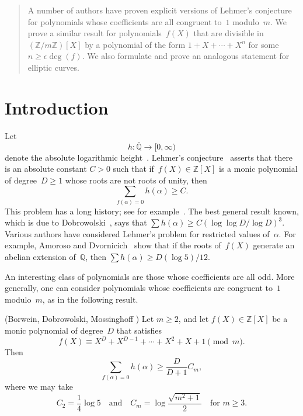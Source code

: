 \begin{abstract}
A number of authors have proven explicit versions of Lehmer's
conjecture for polynomials whose coefficients are all congruent to~$1$
modulo~$m$. We prove a similar result for polynomials~$f(X)$ that are
divisible in~$({\mathbb{Z}}/m{\mathbb{Z}})[X]$ by a polynomial of the form
$1+X+\cdots+X^n$ for some $n\ge{\epsilon} \deg(f)$. We also formulate and
prove an analogous statement for elliptic curves.
\end{abstract}

\maketitle

\section*{Introduction}

Let
\[
  h:{{\bar{\mathbb{Q}}}}\longrightarrow[0,\infty)
\]
denote the absolute logarithmic height~\cite{HiSi,LangDG}. Lehmer's
conjecture~\cite{Leh} asserts that there is an absolute constant $C>0$
such that if~$f(X)\in{\mathbb{Z}}[X]$ is a monic polynomial of degree~$D\ge1$
whose roots are not roots of unity, then
\begin{equation}
  \label{eqn:lehmerconj}
  \sum_{f({\alpha})=0} h({\alpha}) \ge C.
\end{equation}
This problem has a long history; see for
example~\cite{BlMo,Leh,Smy2,Smy1,Stew}.  The best general result
known, which is due to Dobrowolski~\cite{Dob}, says that $\sum
h({\alpha})\ge C(\log\log D/\log D)^3$.  Various authors have considered
Lehmer's problem for restricted values of~${\alpha}$. For example, Amoroso
and Dvornicich~\cite{AmDv} show that if the roots of~$f(X)$ generate
an abelian extension of~${\mathbb{Q}}$, then $\sum h({\alpha})\ge D(\log5)/12$.  
\par
An interesting class of polynomials are those whose coefficients are
all odd. More generally, one can consider polynomials whose
coefficients are congruent to~$1$ modulo~$m$, as in the following
result.

\begin{theorem}
\label{thm:lehmodm}
\textup{(Borwein, Dobrowolski, Mossinghoff \cite{BoDoMo})} 
Let $m\ge2$, and let $f(X)\in{\mathbb{Z}}[X]$ be a monic polynomial of
degree~$D$ that satisfies
\begin{equation}
\label{eqn:feqaop}
   f(X) \equiv X^D+X^{D-1}+\cdots+X^2+X+1 \pmod{m}.
\end{equation}
Then
\[
  \sum_{f({\alpha})=0} h({\alpha}) \ge \frac{D}{D+1}C_m,
\]
where we may take
\[
  C_2 = \frac{1}{4}\log5
  \quad\text{and}\quad
  C_m = \log\frac{\sqrt{m^2+1}}{2}\quad\text{for $m\ge3$.}
\]
\end{theorem}

